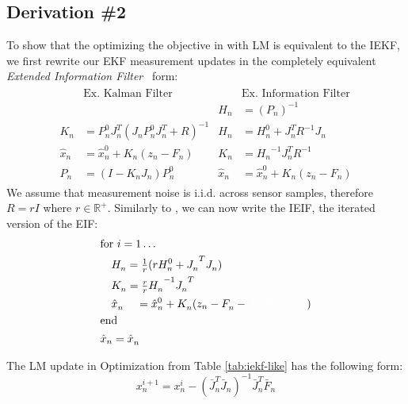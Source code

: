 \subsection{Derivation \#2}
\label{app:ieif-lm}
% 
To show that the optimizing the objective in  with LM is equivalent to the IEKF, we first rewrite our EKF measurement updates in the completely equivalent \emph{Extended Information Filter}~\cite{anderson1979optimal} form:
% 
\begin{gather*}
\begin{aligned}
&\text{Ex. Kalman Filter}                           &       &\text{Ex. Information Filter} \\
&                                                   &       H_n &= \left(P_n\right)^{-1} \\
K_n &= P_n^0 J_n^T(J_n P_n^0 J_n^T + R)^{-1}        &       H_n &= H_n^0 + J_n^T R^{-1} J_n \\
\hat{x}_n &= \hat{x}_n^0 + K_n(z_n - F_n)           &       K_n &= {H_n}^{-1} J_n^T R^{-1} \\
P_n &= (I - K_n J_n)P_n^0                           &       \hat{x}_n &= \hat{x}_n^0 + K_n (z_n - F_n)
\end{aligned}
\label{tab:ieif}
\end{gather*}
%  
We assume that measurement noise is i.i.d. across sensor samples, therefore $R=rI$ where $r\in \mathbb{R}^+$. Similarly to , we can now write the IEIF, the iterated version of the EIF:
\begin{gather}
\begin{aligned}
&\text{for } i=1 \dots  \\
&\quad H_n^\textit{\color{accent}$i$} = \tfrac{1}{r} (r H_n^0 +{J_n^\textit{\color{accent}$i$}}^T J_n^\textit{\color{accent}$i$}) \\
&\quad K_n^\textit{\color{accent}$i$} =\tfrac{r}{r} {H_n^\textit{\color{accent}$i$}}^{-1} {J_n^\textit{\color{accent}$i$}}^T \\
&\quad \hat{x}_n^\textit{\color{accent}$i + 1$} = \hat{x}_n^0 + K_n^\textit{\color{accent}$i$}(z_n - F_n^\textit{\color{accent}$i$} - \textit{\color{accent} $J_n^i(\hat{x}_n^0 - \hat{x}_n^i)$}) \\
&\text{end} \\
&\hat{x}_n = \hat{x}_n^\textit{\color{accent}$i$}
\end{aligned}
\end{gather}

The LM update in Optimization from Table \ref{tab:iekf-like} has the following form: 
\begin{equation}
    x_n^{i + 1}= x_n^{i} - (\bar{J}_n^T \bar{J}_n)^{-1} \bar{J}_n^T \bar{F}_n 
\end{equation}
 
